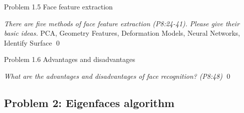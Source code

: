 \documentclass[
        ]{beamer}
\begin{document}
\begin{frame}[t]{Problem 1.5 Face feature extraction}    		
	\begin{overprint}
	\emph{There are five methods of face feature extraction (P8:24-41). Please give their basic ideas.}
	\onslide<2> 
	PCA, Geometry Features, Deformation Models, Neural Networks, Identify Surface
	\onslide<3> 
	\onslide<4> 
	\onslide<5> 
	\onslide<6> 
	\onslide<7> 
	\onslide<8> 
	\onslide<9> 
	\onslide<10> 
	\onslide<11> 
	\onslide<12> 
	\onslide<13> 
	\onslide<14> 
	\onslide<15> 
	\onslide<16> 
	\onslide<17> 
	\onslide<18> 
	\onslide<19> \qed		
	\end{overprint}
\end{frame}

\begin{frame}[t]{Problem 1.6 Advantages and disadvantages}    		
	\begin{overprint}
	\onslide<1>
	\emph{What are the advantages and disadvantages of face recognition? (P8:48)}
	\onslide<2> \qed		
	\end{overprint}
\end{frame}
		
\subsection{Problem 2: Eigenfaces algorithm}
\end{document}
